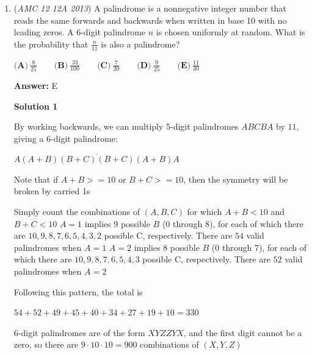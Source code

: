 \begin{enumerate}
 


 \textbf{= Solution 9 (i just lost my dawg)} It seems that $\log (2012+x)$ is going to be less than four, since otherwise, it would imply that $x>7987$, and going down, that seems very impossible.

 Then, the answer is just $\boxed{\textbf{A} (\log{2016}, \log{2017})}$

 Note: This solution is only for people with unlimited aura. (And veryyy limited time)

 \href{https://artofproblemsolving.com/videos/amc/2013amc12a/360}{https://artofproblemsolving.com/videos/amc/2013amc12a/360}

 


	\item (\textit{AMC 12 12A 2013}) A palindrome is a nonnegative integer number that reads the same forwards and backwards when written in base 10 with no leading zeros. A 6-digit palindrome $n$ is chosen uniformly at random. What is the probability that $\frac{n}{11}$ is also a palindrome?


 $\textbf{(A)} \ \frac{8}{25} \qquad \textbf{(B)} \ \frac{33}{100} \qquad \textbf{(C)} \ \frac{7}{20} \qquad \textbf{(D)} \ \frac{9}{25} \qquad \textbf{(E)} \ \frac{11}{30}$

 \textbf{Answer: }E



\textbf{Solution 1}

By working backwards, we can multiply 5-digit palindromes $ABCBA$ by $11$, giving a 6-digit palindrome:

 $\overline{A (A+B) (B+C) (B+C) (A+B) A}$

 Note that if $A + B >= 10$ or $B + C >= 10$, then the symmetry will be broken by carried 1s

 Simply count the combinations of $(A, B, C)$ for which $A + B < 10$ and $B + C < 10$
$A = 1$ implies $9$ possible $B$ (0 through 8), for each of which there are $10, 9, 8, 7, 6, 5, 4, 3, 2$ possible C, respectively. There are $54$ valid palindromes when $A = 1$
$A = 2$ implies $8$ possible $B$ (0 through 7), for each of which there are $10, 9, 8, 7, 6, 5, 4, 3$ possible C, respectively. There are $52$ valid palindromes when $A = 2$

 Following this pattern, the total is

 $54 + 52 + 49 + 45 + 40 + 34 + 27 + 19 + 10 = 330$

 6-digit palindromes are of the form $XYZZYX$, and the first digit cannot be a zero, so there are $9 \cdot 10  \cdot 10 = 900$ combinations of $(X, Y, Z)$


\end{enumerate}
